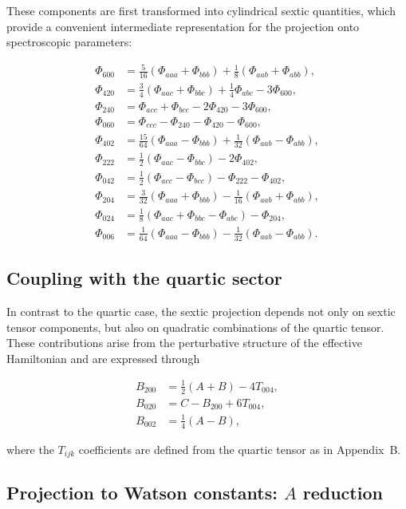 \documentclass[aip,jcp,reprint,floatfix]{revtex4-2}
\begin{document}
These components are first transformed into cylindrical sextic
quantities, which provide a convenient intermediate representation
for the projection onto spectroscopic parameters:

\begin{align}
\Phi_{600} &= \frac{5}{16}(\Phi_{aaa}+\Phi_{bbb})
+\frac{1}{8}(\Phi_{aab}+\Phi_{abb}),\\
\Phi_{420} &= \frac{3}{4}(\Phi_{aac}+\Phi_{bbc})
+\frac{1}{4}\Phi_{abc}-3\Phi_{600},\\
\Phi_{240} &= \Phi_{acc}+\Phi_{bcc}-2\Phi_{420}-3\Phi_{600},\\
\Phi_{060} &= \Phi_{ccc}-\Phi_{240}-\Phi_{420}-\Phi_{600},\\
\Phi_{402} &= \frac{15}{64}(\Phi_{aaa}-\Phi_{bbb})
+\frac{1}{32}(\Phi_{aab}-\Phi_{abb}),\\
\Phi_{222} &= \frac{1}{2}(\Phi_{aac}-\Phi_{bbc})-2\Phi_{402},\\
\Phi_{042} &= \frac{1}{2}(\Phi_{acc}-\Phi_{bcc})
-\Phi_{222}-\Phi_{402},\\
\Phi_{204} &= \frac{3}{32}(\Phi_{aaa}+\Phi_{bbb})
-\frac{1}{16}(\Phi_{aab}+\Phi_{abb}),\\
\Phi_{024} &= \frac{1}{8}(\Phi_{aac}+\Phi_{bbc}-\Phi_{abc})
-\Phi_{204},\\
\Phi_{006} &= \frac{1}{64}(\Phi_{aaa}-\Phi_{bbb})
-\frac{1}{32}(\Phi_{aab}-\Phi_{abb}).
\end{align}

\subsection{Coupling with the quartic sector}

In contrast to the quartic case, the sextic projection depends not only
on sextic tensor components, but also on quadratic combinations of the
quartic tensor. These contributions arise from the perturbative
structure of the effective Hamiltonian and are expressed through

\begin{align}
B_{200} &= \frac{1}{2}(A+B)-4T_{004},\\
B_{020} &= C-B_{200}+6T_{004},\\
B_{002} &= \frac{1}{4}(A-B),
\end{align}

where the $T_{ijk}$ coefficients are defined from the quartic tensor
as in Appendix~B.

\subsection{Projection to Watson constants: $A$ reduction}
\end{document}
